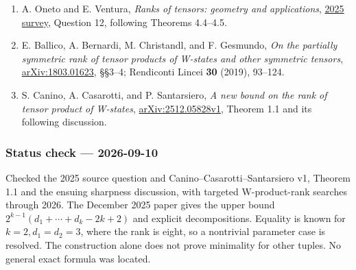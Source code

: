 \documentclass[11pt,a4paper]{article}
\providecommand{\tightlist}{\setlength{\itemsep}{0pt}\setlength{\parskip}{0pt}}
\begin{document}
\begin{enumerate}
\def\labelenumi{\arabic{enumi}.}
\tightlist
\item
  A. Oneto and E. Ventura, \emph{Ranks of tensors: geometry and
  applications}, \href{https://doi.org/10.1007/s40574-025-00472-9}{2025
  survey}, Question 12, following Theorems 4.4--4.5.
\item
  E. Ballico, A. Bernardi, M. Christandl, and F. Gesmundo, \emph{On the
  partially symmetric rank of tensor products of W-states and other
  symmetric tensors},
  \href{https://arxiv.org/abs/1803.01623}{arXiv:1803.01623}, §§3--4;
  Rendiconti Lincei \textbf{30} (2019), 93--124.
\item
  S. Canino, A. Casarotti, and P. Santarsiero, \emph{A new bound on the
  rank of tensor product of W-states},
  \href{https://arxiv.org/html/2512.05828v1}{arXiv:2512.05828v1},
  Theorem 1.1 and its following discussion.
\end{enumerate}

\subsubsection{Status check ---
2026-09-10}\label{status-check-2026-09-10}

Checked the 2025 source question and Canino--Casarotti--Santarsiero v1,
Theorem 1.1 and the ensuing sharpness discussion, with targeted
W-product-rank searches through 2026. The December 2025 paper gives the
upper bound \(2^{k-1}(d_1+\cdots+d_k-2k+2)\) and explicit
decompositions. Equality is known for \(k=2,d_1=d_2=3\), where the rank
is eight, so a nontrivial parameter case is resolved. The construction
alone does not prove minimality for other tuples. No general exact
formula was located.
\end{document}
